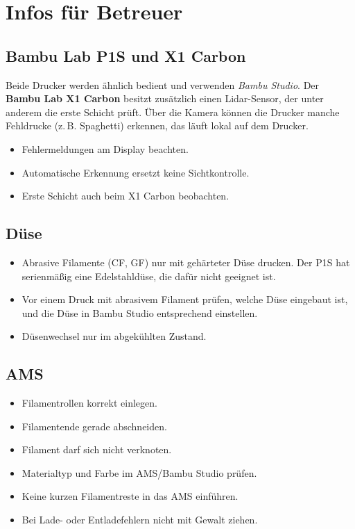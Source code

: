 \documentclass{\basedir/fablab-document}
\begin{document}
	\section{Infos für Betreuer}
	
	\subsection{Bambu Lab P1S und X1 Carbon}
	
	Beide Drucker werden ähnlich bedient und verwenden \textit{Bambu Studio}. Der \textbf{Bambu Lab X1 Carbon} besitzt zusätzlich einen Lidar-Sensor, der unter anderem die erste Schicht prüft. Über die Kamera können die Drucker manche Fehldrucke (z.\,B. Spaghetti) erkennen, das läuft lokal auf dem Drucker.
	
	\begin{itemize}
		\item Fehlermeldungen am Display beachten.
		\item Automatische Erkennung ersetzt keine Sichtkontrolle.
		\item Erste Schicht auch beim X1 Carbon beobachten.
	\end{itemize}
	
	\subsection{Düse}
	
	\begin{itemize}
		\item Abrasive Filamente (CF, GF) nur mit gehärteter Düse drucken. Der P1S hat serienmäßig eine Edelstahldüse, die dafür nicht geeignet ist.
		\item Vor einem Druck mit abrasivem Filament prüfen, welche Düse eingebaut ist, und die Düse in Bambu Studio entsprechend einstellen.
		\item Düsenwechsel nur im abgekühlten Zustand.
	\end{itemize}
	
	\subsection{AMS}
	
	\begin{itemize}
		\item Filamentrollen korrekt einlegen.
		\item Filamentende gerade abschneiden.
		\item Filament darf sich nicht verknoten.
		\item Materialtyp und Farbe im AMS/Bambu Studio prüfen.
		\item Keine kurzen Filamentreste in das AMS einführen.
		\item Bei Lade- oder Entladefehlern nicht mit Gewalt ziehen.
	\end{itemize}
	
\end{document}
